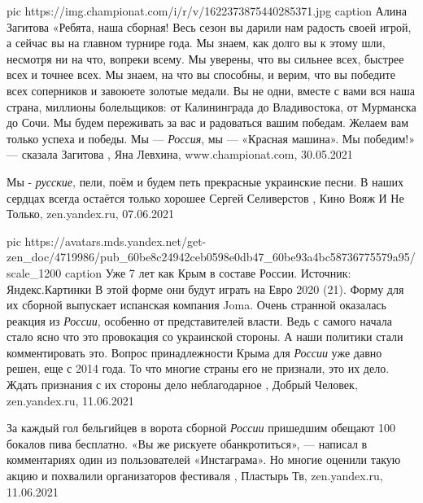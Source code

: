 \ifcmt
  pic https://img.championat.com/i/r/v/1622373875440285371.jpg
  caption Алина Загитова
\fi
«Ребята, наша сборная! Весь сезон вы дарили нам радость своей игрой, а сейчас
вы на главном турнире года. Мы знаем, как долго вы к этому шли, несмотря ни на
что, вопреки всему. Мы уверены, что вы сильнее всех, быстрее всех и точнее
всех. Мы знаем, на что вы способны, и верим, что вы победите всех соперников и
завоюете золотые медали.  Вы не одни, вместе с вами вся наша страна, миллионы
болельщиков: от Калининграда до Владивостока, от Мурманска до Сочи. Мы будем
переживать за вас и радоваться вашим победам. Желаем вам только успеха и
победы. Мы — \emph{Россия}, мы — «Красная машина». Мы победим!» — сказала Загитова
, 
Яна Левхина, www.championat.com, 30.05.2021

Мы - \emph{русские}, пели, поём и будем петь прекрасные украинские песни. В
наших сердцах всегда остаётся только хорошее
Сергей Селиверстов
, 
Кино Вояж И Не Только, zen.yandex.ru, 07.06.2021

\ifcmt
  pic https://avatars.mds.yandex.net/get-zen_doc/4719986/pub_60be8c24942ceb0598e0db47_60be93a4bc58736775579a95/scale_1200
  caption Уже 7 лет как Крым в составе России. Источник: Яндекс.Картинки
\fi
В этой форме они будут играть на Евро 2020 (21). Форму для их сборной выпускает
испанская компания Joma.  Очень странной оказалась реакция из \emph{России},
особенно от представителей власти. Ведь с самого начала стало ясно что это
провокация со украинской стороны. А наши политики стали комментировать это.
Вопрос принадлежности Крыма для \emph{России} уже давно решен, еще с 2014 года.
То что многие страны его не признали, это их дело. Ждать признания с их стороны
дело
неблагодарное
, 
Добрый Человек, zen.yandex.ru, 11.06.2021

За каждый гол бельгийцев в ворота сборной \emph{России} пришедшим обещают 100
бокалов пива бесплатно. «Вы же рискуете обанкротиться», — написал в
комментариях один из пользователей «Инстаграма». Но многие оценили такую акцию
и похвалили организаторов фестиваля
, 
Пластырь Тв, zen.yandex.ru, 11.06.2021

